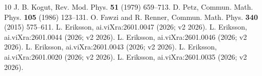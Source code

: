 \documentclass[11pt]{article}
\theoremstyle{remark}
\begin{document}
\begin{thebibliography}{10}
 J. B. Kogut, Rev. Mod. Phys. \textbf{51} (1979)
659--713.
 D. Petz, Commun. Math. Phys. \textbf{105} (1986)
123--131.
 O. Fawzi and R. Renner, Commun. Math. Phys. \textbf{340}
(2015) 575--611.
 L. Eriksson, ai.viXra:2601.0047 (2026; v2 2026).
 L. Eriksson, ai.viXra:2601.0044 (2026; v2 2026).
 L. Eriksson, ai.viXra:2601.0046 (2026; v2 2026).
 L. Eriksson, ai.viXra:2601.0043 (2026; v2 2026).
 L. Eriksson, ai.viXra:2601.0020 (2026; v2 2026).
 L. Eriksson, ai.viXra:2601.0035 (2026; v2 2026).
\end{thebibliography}
\end{document}
